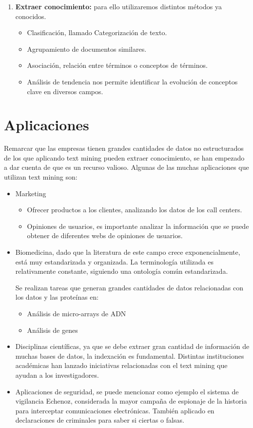 \documentclass[12pt, twoside, openright]{report} %
\begin{document}
\begin{enumerate}
	\item \textbf{Extraer conocimiento:} para ello utilizaremos distintos métodos ya conocidos.
	\begin{itemize}
		\item Clasificación, llamado Categorización de texto.
		\item Agrupamiento de documentos similares.
		\item Asociación, relación entre términos o conceptos de términos.
		\item Análisis de tendencia nos permite identificar la evolución de conceptos clave en diversos campos.
	\end{itemize}
\end{enumerate}

\section{Aplicaciones}
Remarcar que las empresas tienen grandes cantidades de datos no estructurados de los que aplicando text mining pueden extraer conocimiento, se han empezado a dar cuenta de que es un recurso valioso.
Algunas de las muchas aplicaciones que utilizan text mining son:
\begin{itemize}
	\item Marketing
	\begin{itemize}
		\item Ofrecer productos a los clientes, analizando los datos de los call centers.
		\item Opiniones de usuarios, es importante analizar la información que se puede obtener de diferentes webs de opiniones de usuarios.
	\end{itemize}
	\item Biomedicina, dado que la literatura de este campo crece exponencialmente, está muy estandarizada y organizada. La terminología utilizada es relativamente constante, siguiendo una ontología común estandarizada. 
	
	Se realizan tareas que generan grandes cantidades de datos relacionadas con los datos y las proteínas en:
	\begin{itemize}
		\item Análisis de micro-arrays de ADN
		\item Análisis de genes
	\end{itemize}
	\item Disciplinas científicas, ya que se debe extraer gran cantidad de información de muchas bases de datos, la indexación es fundamental. Distintas instituciones académicas han lanzado iniciativas relacionadas con el text mining que ayudan a los investigadores.
	\item Aplicaciones de seguridad, se puede mencionar como ejemplo el sistema de vigilancia Echenoz, considerada la mayor campaña de espionaje de la historia para interceptar comunicaciones electrónicas. También aplicado en declaraciones de criminales para saber si ciertas o falsas.
\end{itemize}
\end{document}
